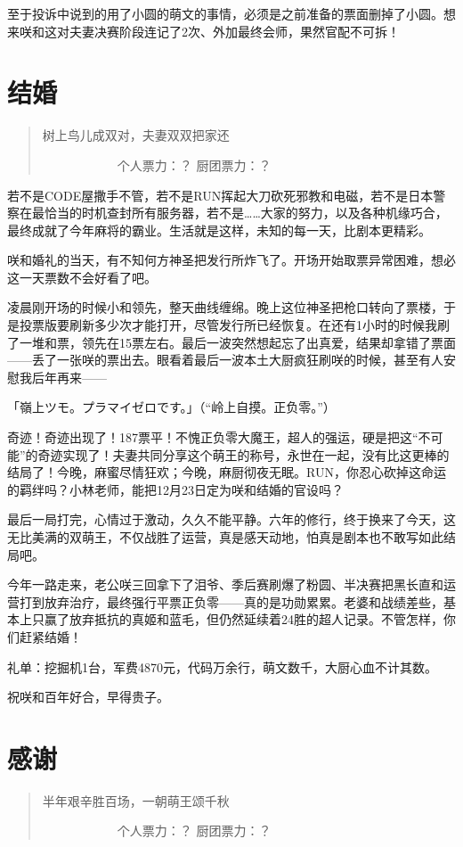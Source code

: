 至于投诉中说到的用了小圆的萌文的事情，必须是之前准备的票面删掉了小圆。想来咲和这对夫妻决赛阶段连记了2次、外加最终会师，果然官配不可拆！


\chapter{结婚}
\begin{quote}
树上鸟儿成双对，夫妻双双把家还

　　　　　　个人票力：？ 厨团票力：？
\end{quote}

若不是CODE屋撒手不管，若不是RUN挥起大刀砍死邪教和电磁，若不是日本警察在最恰当的时机查封所有服务器，若不是……大家的努力，以及各种机缘巧合，最终成就了今年麻将的霸业。生活就是这样，未知的每一天，比剧本更精彩。

咲和婚礼的当天，有不知何方神圣把发行所炸飞了。开场开始取票异常困难，想必这一天票数不会好看了吧。

凌晨刚开场的时候小和领先，整天曲线缠绵。晚上这位神圣把枪口转向了票楼，于是投票版要刷新多少次才能打开，尽管发行所已经恢复。在还有1小时的时候我刷了一堆和票，领先在15票左右。最后一波突然想起忘了出真爱，结果却拿错了票面——丢了一张咲的票出去。眼看着最后一波本土大厨疯狂刷咲的时候，甚至有人安慰我后年再来——

「嶺上ツモ。プラマイゼロです。」（“岭上自摸。正负零。”）

奇迹！奇迹出现了！187票平！不愧正负零大魔王，超人的强运，硬是把这“不可能”的奇迹实现了！夫妻共同分享这个萌王的称号，永世在一起，没有比这更棒的结局了！今晚，麻蜜尽情狂欢；今晚，麻厨彻夜无眠。RUN，你忍心砍掉这命运的羁绊吗？小林老师，能把12月23日定为咲和结婚的官设吗？

最后一局打完，心情过于激动，久久不能平静。六年的修行，终于换来了今天，这无比美满的双萌王，不仅战胜了运营，真是感天动地，怕真是剧本也不敢写如此结局吧。

今年一路走来，老公咲三回拿下了泪爷、季后赛刷爆了粉圆、半决赛把黑长直和运营打到放弃治疗，最终强行平票正负零——真的是功勋累累。老婆和战绩差些，基本上只赢了放弃抵抗的真姬和蓝毛，但仍然延续着24胜的超人记录。不管怎样，你们赶紧结婚！

礼单：挖掘机1台，军费4870元，代码万余行，萌文数千，大厨心血不计其数。

祝咲和百年好合，早得贵子。


\chapter{感谢}
\begin{quote}
半年艰辛胜百场，一朝萌王颂千秋

　　　　　　个人票力：？ 厨团票力：？
\end{quote}


